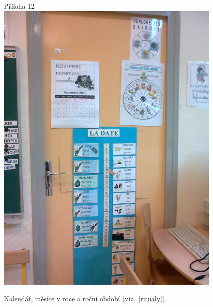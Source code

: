 	\begin{figure}[tb]
		\centering
		Příloha 12\\
		\includegraphics[height=0.35\textheight]{./fotky/Obr12.jpg}
		\caption{
			Kalendář, měsíce v roce a roční období (viz.~\ref{ritualy}).
		}
		\label{Obr12}
	\end{figure}

